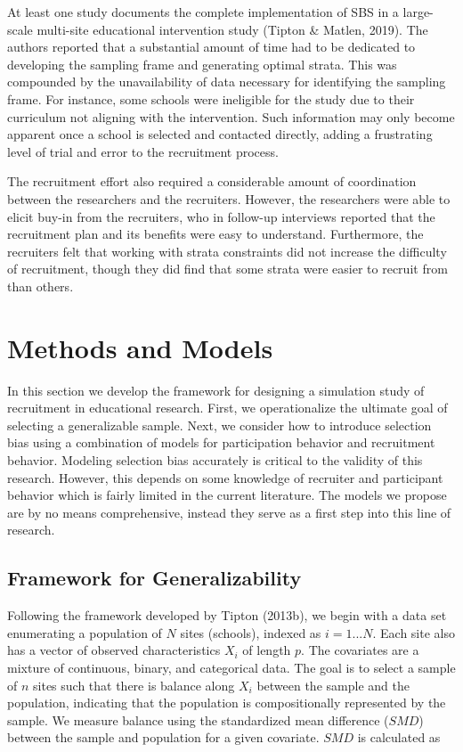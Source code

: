 \documentclass[man,floatsintext]{apa6}
\begin{document}
At least one study documents the complete implementation of SBS in a large-scale multi-site educational intervention study (Tipton \& Matlen, 2019). The authors reported that a substantial amount of time had to be dedicated to developing the sampling frame and generating optimal strata. This was compounded by the unavailability of data necessary for identifying the sampling frame. For instance, some schools were ineligible for the study due to their curriculum not aligning with the intervention. Such information may only become apparent once a school is selected and contacted directly, adding a frustrating level of trial and error to the recruitment process.

The recruitment effort also required a considerable amount of coordination between the researchers and the recruiters. However, the researchers were able to elicit buy-in from the recruiters, who in follow-up interviews reported that the recruitment plan and its benefits were easy to understand. Furthermore, the recruiters felt that working with strata constraints did not increase the difficulty of recruitment, though they did find that some strata were easier to recruit from than others.

\hypertarget{methods-and-models}{%
\section{Methods and Models}\label{methods-and-models}}

In this section we develop the framework for designing a simulation study of recruitment in educational research. First, we operationalize the ultimate goal of selecting a generalizable sample. Next, we consider how to introduce selection bias using a combination of models for participation behavior and recruitment behavior. Modeling selection bias accurately is critical to the validity of this research. However, this depends on some knowledge of recruiter and participant behavior which is fairly limited in the current literature. The models we propose are by no means comprehensive, instead they serve as a first step into this line of research.

\hypertarget{framework-for-generalizability}{%
\subsection{Framework for Generalizability}\label{framework-for-generalizability}}

Following the framework developed by Tipton (2013b), we begin with a data set enumerating a population of \(N\) sites (schools), indexed as \(i = 1 ... N\). Each site also has a vector of observed characteristics \(X_i\) of length \(p\). The covariates are a mixture of continuous, binary, and categorical data. The goal is to select a sample of \(n\) sites such that there is balance along \(X_i\) between the sample and the population, indicating that the population is compositionally represented by the sample. We measure balance using the standardized mean difference (\(SMD\)) between the sample and population for a given covariate. \(SMD\) is calculated as
\end{document}
